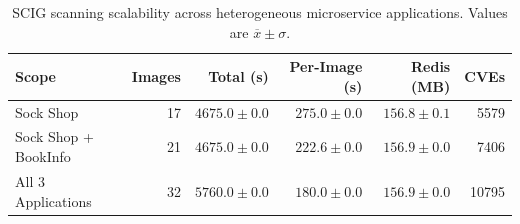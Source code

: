 \begin{table}[htbp]
\centering
\caption{SCIG scanning scalability across heterogeneous microservice applications. Values are $\overline{x} \pm \sigma$.}
\label{tab:scig_s3_scalability}
\begin{tabular}{lrrrrr}
\toprule
\textbf{Scope} & \textbf{Images} & \textbf{Total (s)} & \textbf{Per-Image (s)} & \textbf{Redis (MB)} & \textbf{CVEs} \\
\midrule
Sock Shop & 17 & $4675.0 \pm 0.0$ & $275.0 \pm 0.0$ & $156.8 \pm 0.1$ & 5579 \\
Sock Shop + BookInfo & 21 & $4675.0 \pm 0.0$ & $222.6 \pm 0.0$ & $156.9 \pm 0.0$ & 7406 \\
All 3 Applications & 32 & $5760.0 \pm 0.0$ & $180.0 \pm 0.0$ & $156.9 \pm 0.0$ & 10795 \\
\bottomrule
\end{tabular}
\end{table}